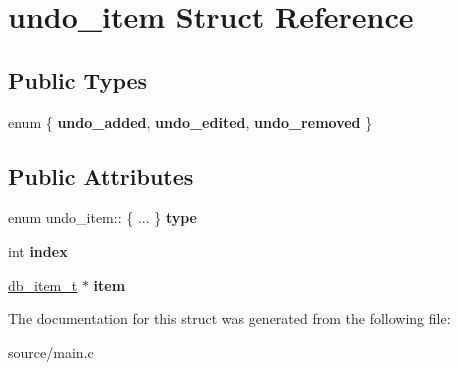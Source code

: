 \hypertarget{structundo__item}{}\section{undo\+\_\+item Struct Reference}
\label{structundo__item}
\subsection*{Public Types}
\begin{DoxyCompactItemize}
\item 
enum \{ {\bfseries undo\+\_\+added}, 
{\bfseries undo\+\_\+edited}, 
{\bfseries undo\+\_\+removed}
 \}\hypertarget{structundo__item_a527f82d45b87a81272a1d38da91634fd}{}\label{structundo__item_a527f82d45b87a81272a1d38da91634fd}

\end{DoxyCompactItemize}
\subsection*{Public Attributes}
\begin{DoxyCompactItemize}
\item 
enum undo\+\_\+item\+:: \{ ... \}  {\bfseries type}\hypertarget{structundo__item_a01af4c4ea98c2ec146f322c4e445cd82}{}\label{structundo__item_a01af4c4ea98c2ec146f322c4e445cd82}

\item 
int {\bfseries index}\hypertarget{structundo__item_a202a68820a773dd867196c2d22bc75aa}{}\label{structundo__item_a202a68820a773dd867196c2d22bc75aa}

\item 
\hyperlink{structdb__item}{db\+\_\+item\+\_\+t} $\ast$ {\bfseries item}\hypertarget{structundo__item_a497326db0b55e6b4e901a0b49a3eafb8}{}\label{structundo__item_a497326db0b55e6b4e901a0b49a3eafb8}

\end{DoxyCompactItemize}


The documentation for this struct was generated from the following file\+:\begin{DoxyCompactItemize}
\item 
source/main.\+c\end{DoxyCompactItemize}

